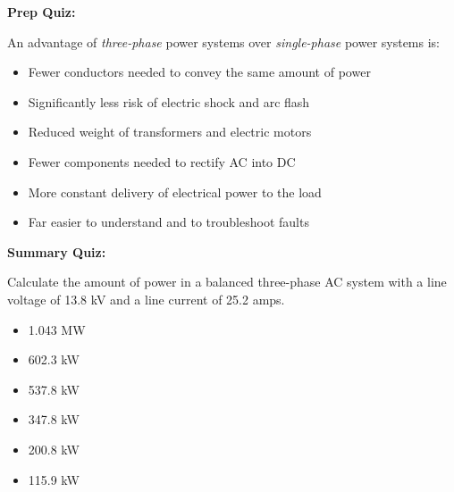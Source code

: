 \vfil \eject

\noindent
{\bf Prep Quiz:}

An advantage of {\it three-phase} power systems over {\it single-phase} power systems is:

\begin{itemize}
\item{} Fewer conductors needed to convey the same amount of power
\vskip 5pt 
\item{} Significantly less risk of electric shock and arc flash
\vskip 5pt 
\item{} Reduced weight of transformers and electric motors
\vskip 5pt 
\item{} Fewer components needed to rectify AC into DC
\vskip 5pt 
\item{} More constant delivery of electrical power to the load
\vskip 5pt 
\item{} Far easier to understand and to troubleshoot faults
\end{itemize}








\vfil \eject

\noindent
{\bf Summary Quiz:}

Calculate the amount of power in a balanced three-phase AC system with a line voltage of 13.8 kV and a line current of 25.2 amps.

\begin{itemize}
\item{} 1.043 MW
\vskip 5pt 
\item{} 602.3 kW
\vskip 5pt 
\item{} 537.8 kW
\vskip 5pt 
\item{} 347.8 kW
\vskip 5pt 
\item{} 200.8 kW
\vskip 5pt 
\item{} 115.9 kW
\end{itemize}



